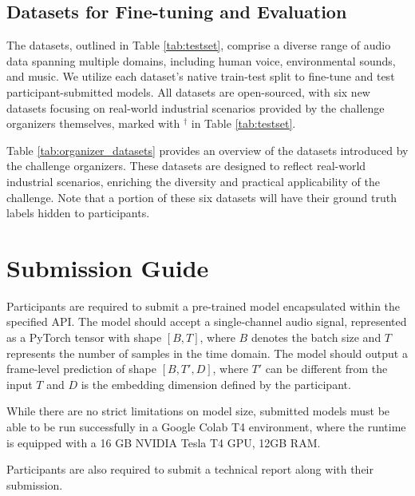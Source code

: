 \documentclass{article}
\begin{document}
\subsection{Datasets for Fine-tuning and Evaluation}

The datasets, outlined in Table \ref{tab:testset}, comprise a diverse range of audio data spanning multiple domains, including human voice, environmental sounds, and music.
We utilize each dataset's native train-test split to fine-tune and test participant-submitted models.
All datasets are open-sourced, with six new datasets focusing on real-world industrial scenarios provided by the challenge organizers themselves, marked with $^{\dagger}$ in Table \ref{tab:testset}.

Table \ref{tab:organizer_datasets} provides an overview of the datasets introduced by the challenge organizers.
These datasets are designed to reflect real-world industrial scenarios, enriching the diversity and practical applicability of the challenge.
Note that a portion of these six datasets will have their ground truth labels hidden to participants.

\section{Submission Guide}

Participants are required to submit a pre-trained model encapsulated within the specified API.
The model should accept a single-channel audio signal, represented as a PyTorch tensor with shape $[B, T]$, where $B$ denotes the batch size and $T$ represents the number of samples in the time domain.
The model should output a frame-level prediction of shape $[B, T', D]$, where $T'$ can be different from the input $T$ and $D$ is the embedding dimension defined by the participant.

While there are no strict limitations on model size, submitted models must be able to be run successfully in a Google Colab T4 environment, where the runtime is equipped with a 16 GB NVIDIA Tesla T4 GPU, 12GB RAM.

Participants are also required to submit a technical report along with their submission.
\end{document}
